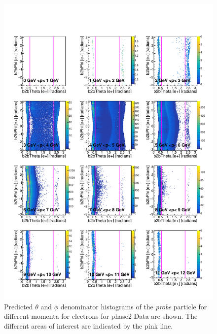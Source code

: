 \documentclass[a4paper,11pt,twosided,final,german,openbib,pdftex,listof=totoc,bibliography=totoc]{scrbook}
\begin{document}
\begin{appendix}
\clearpage





\begin{figure}[h!]
	\includegraphics[width=\textwidth]{Plots/master/RTPMemD_Data.pdf}
	\caption[Denominator $\theta$-$\phi$ Electron Momentum Phase2 Data]{Predicted $\theta$ and $\phi$ denominator histograms of the \textit{probe} particle for different momenta for electrons for phase2 Data are shown. The different areas of interest are indicated by the pink line.}
	\label{plt:RTPMemD_Data}
\end{figure}




\end{appendix}
\end{document}
